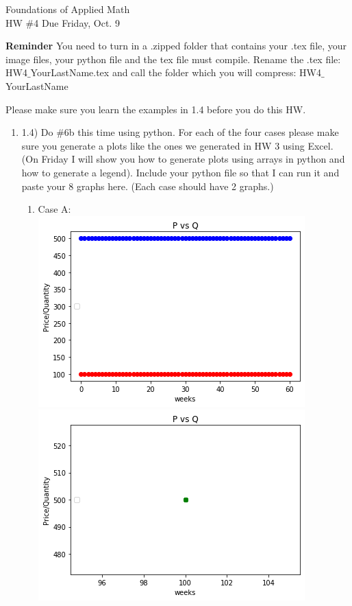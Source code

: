 \documentclass[12pt,letterpaper]{article}
\begin{document}
Foundations of Applied Math\\
 HW \#4
 Due Friday, Oct. 9

\textbf{Reminder} You need to turn in a .zipped folder that contains your .tex file, your image files, your python file and the tex file must compile.
Rename the .tex file: HW4$\_$YourLastName.tex and call the folder which you will compress: HW4$\_$YourLastName

Please make sure you learn the examples in 1.4 before you do this HW.

\begin{enumerate}

\item 1.4) Do \#6b this time using python. For each of the four cases please make sure you generate a plots like the ones we generated in HW 3 using Excel.  (On Friday I will show you how to generate plots using arrays in python and how to generate a legend). Include your python file so that I can run it and paste your 8 graphs here. (Each case should have 2 graphs.)
\begin{enumerate}
  \item Case A: \\ \includegraphics[scale = .5]{1.4 6 a.png}
  \includegraphics[scale = .5]{1.4 6 a2.png}

\end{enumerate}
\end{enumerate}
\end{document}
